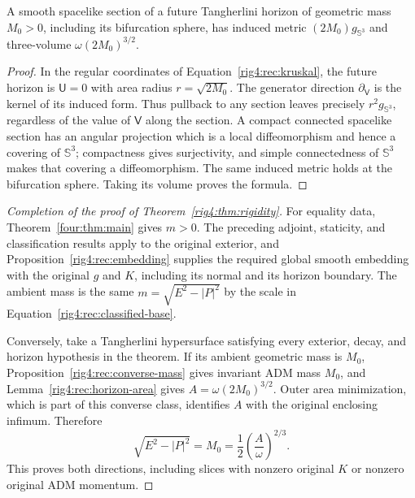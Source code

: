 \begin{lemma}
\label{rig4:rec:horizon-area}
A smooth spacelike section of a future Tangherlini horizon of geometric
mass $M_0>0$, including its bifurcation sphere, has induced metric
$(2M_0)g_{\mathbb S^3}$ and three-volume
$\omega(2M_0)^{3/2}$.
\end{lemma}

\begin{proof}
In the regular coordinates of Equation~\eqref{rig4:rec:kruskal}, the future
horizon is $\mathsf U=0$ with area radius $r=\sqrt{2M_0}$.  The generator
direction $\partial_{\mathsf V}$ is the kernel of its induced form.  Thus
pullback to any section leaves precisely $r^2g_{\mathbb S^3}$, regardless
of the value of $\mathsf V$ along the section.  A compact connected spacelike
section has an angular projection which is a local diffeomorphism and hence
a covering of $\mathbb S^3$; compactness gives surjectivity, and simple
connectedness of $\mathbb S^3$ makes that covering a diffeomorphism.  The
same induced metric holds at the bifurcation sphere.  Taking its volume
proves the formula.
\end{proof}

\begin{proof}[Completion of the proof of Theorem~\ref{rig4:thm:rigidity}]
For equality data, Theorem~\ref{four:thm:main} gives $m>0$.
The preceding adjoint, staticity, and classification results apply to the
original exterior, and Proposition~\ref{rig4:rec:embedding} supplies the required
global smooth embedding with the original $g$ and $K$, including its normal
and its horizon boundary.  The ambient mass is the same
$m=\sqrt{E^2-|P|^2}$ by the scale in
Equation~\eqref{rig4:rec:classified-base}.

Conversely, take a Tangherlini hypersurface satisfying every exterior,
decay, and horizon hypothesis in the theorem.  If its ambient geometric
mass is $M_0$, Proposition~\ref{rig4:rec:converse-mass} gives invariant ADM mass
$M_0$, and Lemma~\ref{rig4:rec:horizon-area} gives
$A=\omega(2M_0)^{3/2}$.  Outer area minimization, which is part of this
converse class, identifies $A$ with the original enclosing infimum.
Therefore
\[
 \sqrt{E^2-|P|^2}=M_0
   =\frac12\left(\frac A\omega\right)^{2/3}.
\]
This proves both directions, including slices with nonzero original $K$
or nonzero original ADM momentum.
\end{proof}
